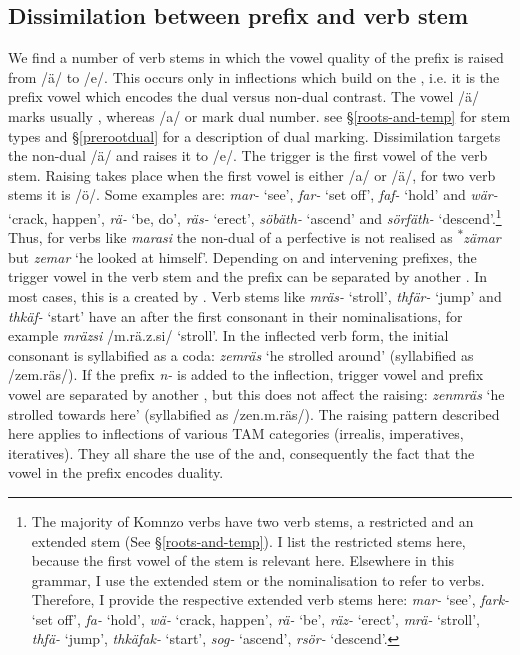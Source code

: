 \subsection{Dissimilation between prefix and verb stem} \label{vowelharmverbstem}

We find a number of verb stems in which the vowel quality of the prefix is raised from /ä/ to /e/. This occurs only in inflections which build on the , i.e. it is the prefix vowel which encodes the dual versus non-dual contrast. The vowel /ä/ marks usually , whereas /a/ or  mark dual number. see \S{}\ref{roots-and-temp} for stem types and \S{}\ref{prerootdual} for a description of dual marking. Dissimilation targets the non-dual /ä/ and raises it to /e/. The trigger is the first vowel of the verb stem. Raising takes place when the first vowel is either /a/ or /ä/, for two verb stems it is /ö/. Some examples are: \emph{mar-} `see', \emph{far-} `set off', \emph{faf-} `hold' and \emph{wär-} `crack, happen', \emph{rä-} `be, do', \emph{räs-} `erect', \emph{söbäth-} `ascend' and \emph{sörfäth-} `descend'.\footnote{The majority of Komnzo verbs have two verb stems, a restricted and an extended stem (See \S\ref{roots-and-temp}). I list the restricted stems here, because the first vowel of the stem is relevant here. Elsewhere in this grammar, I use the extended stem or the nominalisation to refer to verbs. Therefore, I provide the respective extended verb stems here: \emph{mar-} `see', \emph{fark-} `set off', \emph{fa-} `hold', \emph{wä-} `crack, happen', \emph{rä-} `be', \emph{räz-} `erect', \emph{mrä-} `stroll', \emph{thfä-} `jump', \emph{thkäfak-} `start', \emph{sog-} `ascend', \emph{rsör-} `descend'.} Thus, for verbs like \emph{marasi} the non-dual of a  perfective is not realised as \textsuperscript{$\ast$}\emph{zämar} but \emph{zemar} `he looked at himself'. Depending on  and intervening prefixes, the trigger vowel in the verb stem and the prefix can be separated by another . In most cases, this is a  created by . Verb stems like \emph{mräs-} `stroll', \emph{thfär-} `jump' and \emph{thkäf-} `start' have an  after the first consonant in their nominalisations, for example \emph{mräzsi} /m.rä.z.si/ `stroll'. In the inflected verb form, the initial consonant is syllabified as a coda: \emph{zemräs} `he strolled around' (syllabified as /zem.räs/). If the  prefix \emph{n-} is added to the inflection, trigger vowel and prefix vowel are separated by another , but this does not affect the raising: \emph{zenmräs} `he strolled towards here' (syllabified as /zen.m.räs/). The raising pattern described here applies to inflections of various TAM categories (irrealis, imperatives, iteratives). They all share the use of the  and, consequently the fact that the vowel in the prefix encodes duality.\\

